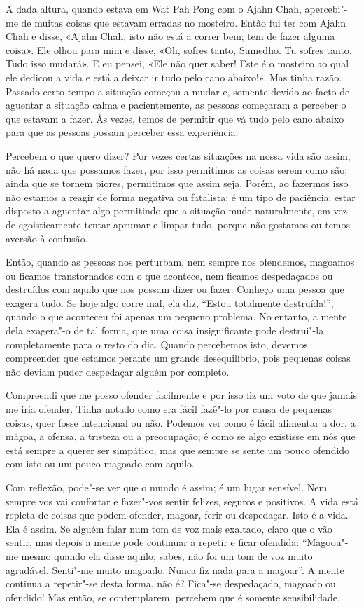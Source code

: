 A dada altura, quando estava em Wat Pah Pong com o Ajahn Chah, apercebi"-me de
muitas coisas que estavam erradas no mosteiro. Então fui ter com Ajahn Chah e disse,
«Ajahn Chah, isto não está a correr bem; tem de fazer alguma coisa». Ele olhou
para mim e disse, «Oh, sofres tanto, Sumedho. Tu sofres tanto. Tudo isso
mudará». E eu pensei, «Ele não quer saber! Este é o mosteiro ao qual ele dedicou
a vida e está a deixar ir tudo pelo cano abaixo!». Mas tinha razão. Passado
certo tempo a situação começou a mudar e, somente devido ao facto de aguentar a
situação calma e pacientemente, as pessoas começaram a perceber o que estavam a
fazer. Às vezes, temos de permitir que vá tudo pelo cano abaixo para que as
pessoas possam perceber essa experiência.

Percebem o que quero dizer? Por vezes certas situações na nossa vida são assim,
não há nada que possamos fazer, por isso permitimos as coisas serem como são;
ainda que se tornem piores, permitimos que assim seja. Porém, ao fazermos isso
não estamos a reagir de forma negativa ou fatalista; é um tipo de paciência:
estar disposto a aguentar algo permitindo que a situação mude naturalmente, em
vez de egoisticamente tentar aprumar e limpar tudo, porque não gostamos ou temos
aversão à confusão.

Então, quando as pessoas nos perturbam, nem sempre nos ofendemos, magoamos ou
ficamos transtornados com o que acontece, nem ficamos despedaçados ou destruídos
com aquilo que nos possam dizer ou fazer. Conheço uma pessoa que exagera tudo.
Se hoje algo corre mal, ela diz, “Estou totalmente destruída!”, quando o que
aconteceu foi apenas um pequeno problema. No entanto, a mente dela exagera"-o de
tal forma, que uma coisa insignificante pode destrui"-la completamente para o resto
do dia. Quando percebemos isto, devemos compreender que estamos perante um
grande desequilíbrio, pois pequenas coisas não deviam puder despedaçar alguém por
completo.

Compreendi que me posso ofender facilmente e por isso fiz um voto de que jamais
me iria ofender. Tinha notado como era fácil fazê"-lo por causa de pequenas
coisas, quer fosse intencional ou não. Podemos ver como é fácil alimentar a dor,
a mágoa, a ofensa, a tristeza ou a preocupação; é como se algo existisse em nós
que está sempre a querer ser simpático, mas que sempre se sente um pouco
ofendido com isto ou um pouco magoado com aquilo.

Com reflexão, pode"-se ver que o mundo é assim; é um lugar sensível. Nem sempre
vos vai confortar e fazer"-vos sentir felizes, seguros e positivos. A vida está
repleta de coisas que podem ofender, magoar, ferir ou despedaçar. Isto é a vida.
Ela é assim. Se alguém falar num tom de voz mais exaltado, claro que o vão
sentir, mas depois a mente pode continuar a repetir e ficar ofendida: “Magoou"-me
mesmo quando ela disse aquilo; sabes, não foi um tom de voz muito agradável.
Senti"-me muito magoado. Nunca fiz nada para a magoar”. A mente continua a
repetir"-se desta forma, não é? Fica"-se despedaçado, magoado ou ofendido! Mas
então, se contemplarem, percebem que é somente sensibilidade.


